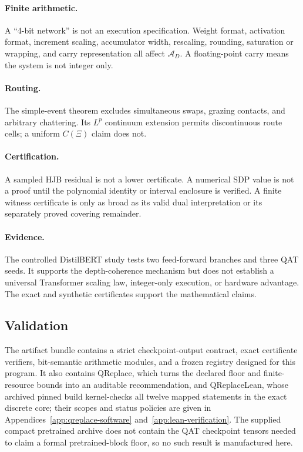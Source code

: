 \documentclass[twoside,11pt]{article}
\begin{document}
\paragraph{Finite arithmetic.}
A ``4-bit network'' is not an execution specification.  Weight format, activation format, increment scaling, accumulator width, rescaling, rounding, saturation or wrapping, and carry representation all affect $\mathcal A_D$.  A floating-point carry means the system is not integer only.

\paragraph{Routing.}
The simple-event theorem excludes simultaneous swaps, grazing contacts, and arbitrary chattering.  Its $L^p$ continuum extension permits discontinuous route cells; a uniform $C(\Xi)$ claim does not.

\paragraph{Certification.}
A sampled HJB residual is not a lower certificate.  A numerical SDP value is not a proof until the polynomial identity or interval enclosure is verified.  A finite witness certificate is only as broad as its valid dual interpretation or its separately proved covering remainder.

\paragraph{Evidence.}
The controlled DistilBERT study tests two feed-forward branches and three QAT seeds.  It supports the depth-coherence mechanism but does not establish a universal Transformer scaling law, integer-only execution, or hardware advantage.  The exact and synthetic certificates support the mathematical claims.%

    
\subsection{Validation}
\label{sec:prospective-main}



The artifact bundle contains a strict checkpoint-output contract, exact certificate verifiers, bit-semantic arithmetic modules, and a frozen registry designed for this program.  It also contains QReplace, which turns the declared floor and finite-resource bounds into an auditable recommendation, and QReplaceLean, whose archived pinned build kernel-checks all twelve mapped statements in the exact discrete core; their scopes and status policies are given in Appendices~\ref{app:qreplace-software} and~\ref{app:lean-verification}.  The supplied compact pretrained archive does not contain the QAT checkpoint tensors needed to claim a formal pretrained-block floor, so no such result is manufactured here.
\end{document}
